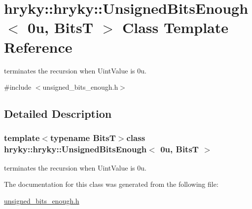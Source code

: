 \hypertarget{classhryky_1_1hryky_1_1_unsigned_bits_enough_3_010u_00_01_bits_t_01_4}{\section{hryky\-:\-:hryky\-:\-:Unsigned\-Bits\-Enough$<$ 0u, Bits\-T $>$ Class Template Reference}
\label{classhryky_1_1hryky_1_1_unsigned_bits_enough_3_010u_00_01_bits_t_01_4}
}


terminates the recursion when Uint\-Value is 0u.  




{\ttfamily \#include $<$unsigned\-\_\-bits\-\_\-enough.\-h$>$}



\subsection{Detailed Description}
\subsubsection*{template$<$typename Bits\-T$>$class hryky\-::hryky\-::\-Unsigned\-Bits\-Enough$<$ 0u, Bits\-T $>$}

terminates the recursion when Uint\-Value is 0u. 

The documentation for this class was generated from the following file\-:\begin{DoxyCompactItemize}
\item 
\hyperlink{unsigned__bits__enough_8h}{unsigned\-\_\-bits\-\_\-enough.\-h}\end{DoxyCompactItemize}
